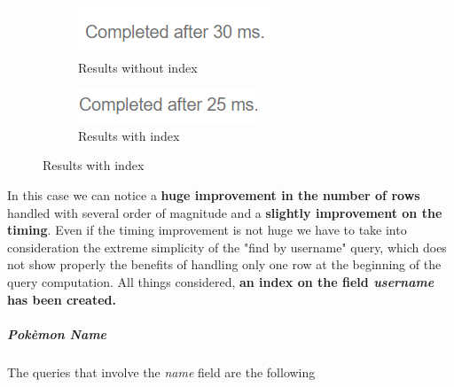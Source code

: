 \begin{figure}[H]
\begin{subfigure}{0.5\textwidth}
	\end{subfigure}
\end{figure}
\begin{figure}[H]
	\begin{subfigure}{0.5\textwidth}
		\includegraphics[width=0.9\linewidth]{img/user_without_index_2.png} 
		\caption{Results without index}
	\end{subfigure}
	\begin{subfigure}{0.5\textwidth}
		\includegraphics[width=0.9\linewidth]{img/user_with_index_2.png}
		\caption{Results with index}
	\end{subfigure}
\end{figure}

In this case we can notice a \textbf{huge improvement in the number of rows} handled with several order of magnitude and a \textbf{slightly improvement on the timing}. Even if the timing improvement is not huge we have to take into consideration the extreme simplicity of the "find by username" query, which does not show properly the benefits of handling only one row at the beginning of the query computation. All things considered, \textbf{an index on the field \textit{username} has been created.}

\subparagraph{Pokèmon Name}
The queries that involve the \textit{name} field are the following

